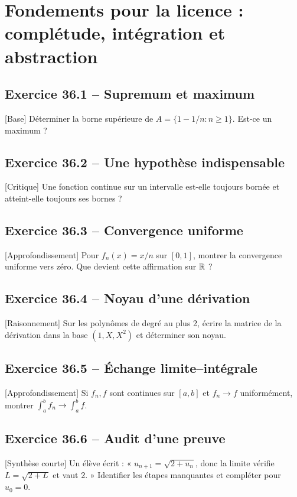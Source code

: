 \chapter{Fondements pour la licence : complétude, intégration et abstraction}
\section*{Exercice 36.1 -- Supremum et maximum}
[Base] Déterminer la borne supérieure de $A=\{1-1/n:n\ge1\}$. Est-ce un maximum ?

\section*{Exercice 36.2 -- Une hypothèse indispensable}
[Critique] Une fonction continue sur un intervalle est-elle toujours bornée et atteint-elle toujours ses bornes ?

\section*{Exercice 36.3 -- Convergence uniforme}
[Approfondissement] Pour $f_n(x)=x/n$ sur $[0,1]$, montrer la convergence uniforme vers zéro. Que devient cette affirmation sur $\mathbb{R}$ ?

\section*{Exercice 36.4 -- Noyau d’une dérivation}
[Raisonnement] Sur les polynômes de degré au plus 2, écrire la matrice de la dérivation dans la base $(1,X,X^2)$ et déterminer son noyau.

\section*{Exercice 36.5 -- Échange limite–intégrale}
[Approfondissement] Si $f_n,f$ sont continues sur $[a,b]$ et $f_n\to f$ uniformément, montrer $\int_a^bf_n\to\int_a^bf$.

\section*{Exercice 36.6 -- Audit d’une preuve}
[Synthèse courte] Un élève écrit : « $u_{n+1}=\sqrt{2+u_n}$, donc la limite vérifie $L=\sqrt{2+L}$ et vaut 2. » Identifier les étapes manquantes et compléter pour $u_0=0$.
